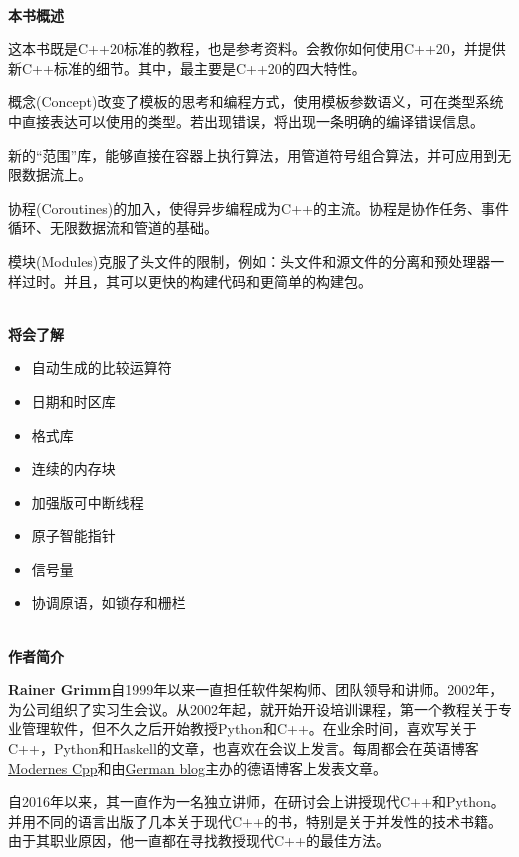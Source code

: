 \documentclass[11pt,a4paper,UTF8]{book}
\begin{document}
\begin{sloppypar}
		\hspace*{\fill} \\ %
		\noindent\textbf{本书概述}
		
		这本书既是C++20标准的教程，也是参考资料。会教你如何使用C++20，并提供新C++标准的细节。其中，最主要是C++20的四大特性。
		
		概念(Concept)改变了模板的思考和编程方式，使用模板参数语义，可在类型系统中直接表达可以使用的类型。若出现错误，将出现一条明确的编译错误信息。
		
		新的“范围”库，能够直接在容器上执行算法，用管道符号组合算法，并可应用到无限数据流上。
		
		协程(Coroutines)的加入，使得异步编程成为C++的主流。协程是协作任务、事件循环、无限数据流和管道的基础。
		
		模块(Modules)克服了头文件的限制，例如：头文件和源文件的分离和预处理器一样过时。并且，其可以更快的构建代码和更简单的构建包。
		
		\hspace*{\fill} \\ %
		\noindent\textbf{将会了解}
		\begin{itemize}
			\item 自动生成的比较运算符
			\item 日期和时区库
			\item 格式库
			\item 连续的内存块
			\item 加强版可中断线程
			\item 原子智能指针
			\item 信号量
			\item 协调原语，如锁存和栅栏
		\end{itemize}
		
		\hspace*{\fill} \\ %
		\noindent\textbf{作者简介}
		
		\textbf{Rainer Grimm}自1999年以来一直担任软件架构师、团队领导和讲师。2002年，为公司组织了实习生会议。从2002年起，就开始开设培训课程，第一个教程关于专业管理软件，但不久之后开始教授Python和C++。在业余时间，喜欢写关于C++，Python和Haskell的文章，也喜欢在会议上发言。每周都会在英语博客\href{https://www.modernescpp.com/}{Modernes Cpp}和由\href{https://www.grimm-jaud.de/index.php/blog}{German blog}主办的德语博客上发表文章。
		
		自2016年以来，其一直作为一名独立讲师，在研讨会上讲授现代C++和Python。并用不同的语言出版了几本关于现代C++的书，特别是关于并发性的技术书籍。由于其职业原因，他一直都在寻找教授现代C++的最佳方法。
		

\end{sloppypar}
\end{document}
